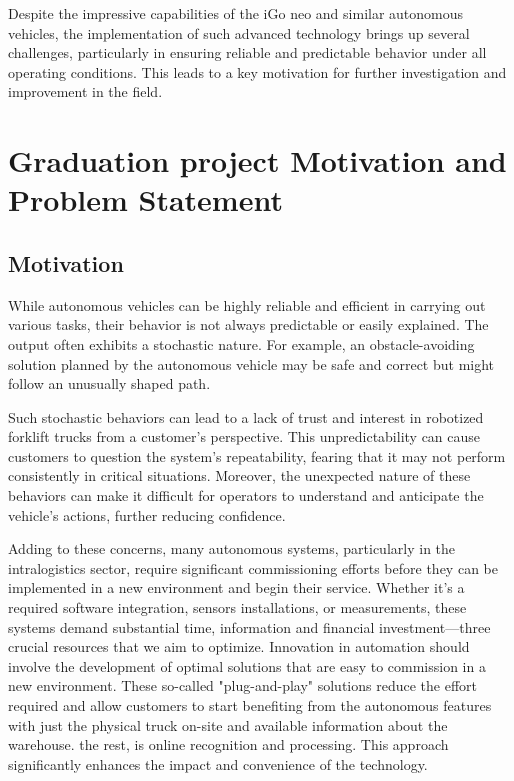 Despite the impressive capabilities of the iGo neo and similar autonomous vehicles, the implementation 
of such advanced technology brings up several challenges, particularly in ensuring reliable and predictable 
behavior under all operating conditions. This leads to a key motivation for further investigation and improvement 
in the field.

\section{Graduation project Motivation and Problem Statement}

\subsection{Motivation}


While autonomous vehicles can be highly reliable and efficient in carrying out various 
tasks, their behavior is not always predictable or easily explained. The output often 
exhibits a stochastic nature. For example, an obstacle-avoiding solution planned by 
the autonomous vehicle may be safe and correct but might follow an unusually shaped path. 

Such stochastic behaviors can lead to a lack of trust and interest in robotized forklift 
trucks from a customer’s perspective. This unpredictability can cause customers to 
question the system's repeatability, fearing that it may not perform consistently in 
critical situations. Moreover, the unexpected nature of these behaviors can make it 
difficult for operators to understand and anticipate the vehicle's actions, further 
reducing confidence. 

Adding to these concerns, many autonomous systems, particularly in the intralogistics 
sector, require significant commissioning efforts before they can be implemented in 
a new environment and begin their service. Whether it's a required software integration, 
sensors installations, or 
measurements, these systems demand substantial time, information and financial investment—three 
crucial resources that we aim to optimize. Innovation in automation should involve 
the development of optimal solutions that are easy to 
commission in a new environment. These so-called "plug-and-play" solutions reduce 
the effort required and allow customers to start benefiting from the autonomous 
features with just the physical truck on-site and available information about the 
warehouse. the rest, is online recognition and processing. This approach 
significantly enhances the impact and convenience of the technology. 

